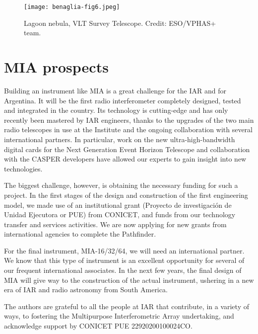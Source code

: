 \documentclass[baaa]{baaa}
\begin{document}
\begin{figure}[!h]
\centering
\texttt{[image: benaglia-fig6.jpeg]}
\caption{Lagoon nebula, VLT Survey Telescope. Credit: ESO/VPHAS+ team.}
\label{fig:lagoonneb}
\end{figure}

\section{MIA prospects}

Building an instrument like MIA is a great challenge for the IAR and for Argentina. It will be the first radio interferometer completely designed, tested and integrated in the country. Its technology is cutting-edge and has only recently been mastered by IAR engineers, thanks to the upgrades of the two main radio telescopes in use at the Institute and the ongoing collaboration with several international partners. In particular, work on the new ultra-high-bandwidth digital cards for the Next Generation Event Horizon Telescope and collaboration with the CASPER developers have allowed our experts to gain insight into new technologies.

The biggest challenge, however, is obtaining the necessary funding for such a project. In the first stages of the design and construction of the first engineering model, we made use of an institutional grant (Proyecto de investigación de Unidad Ejecutora or PUE) from CONICET, and funds from our technology transfer and services activities.
We are now applying for new grants from international agencies to complete the Pathfinder.

For the final instrument, MIA-16/32/64, we will need an international partner. We know that this type of instrument is an excellent opportunity for several of our frequent international associates. In the next few years, the final design of MIA will give way to the construction of the actual instrument, ushering in a new era of IAR and radio astronomy from South America.
 
\begin{acknowledgement}
The authors are grateful to all the people at IAR that contribute, in a variety of ways, to fostering the Multipurpose Interferometric Array undertaking, and acknowledge support by CONICET PUE 22920200100024CO. 
\end{acknowledgement}
\end{document}
